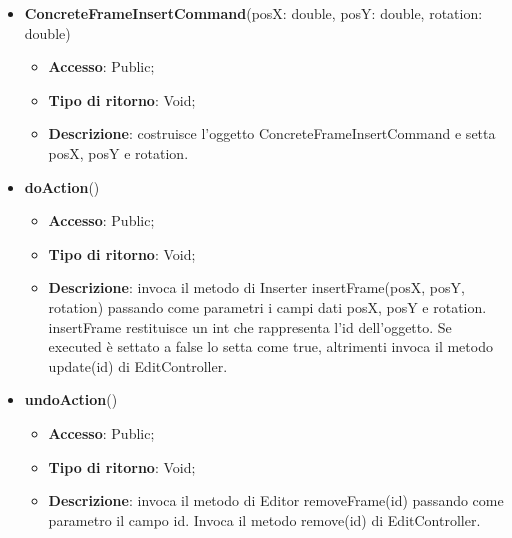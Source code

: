 {{{	
	\begin{itemize}
		\item \textbf{ConcreteFrameInsertCommand}(posX: double, posY: double, rotation: double)
		\begin{itemize}
			\item \textbf{Accesso}: Public;
			\item \textbf{Tipo di ritorno}: Void;
			\item \textbf{Descrizione}: costruisce l’oggetto ConcreteFrameInsertCommand e setta posX, posY e rotation.
		\end{itemize}
		\item \textbf{doAction}()
		\begin{itemize}
			\item \textbf{Accesso}: Public;
			\item \textbf{Tipo di ritorno}: Void;
			\item \textbf{Descrizione}: invoca il metodo di Inserter insertFrame(posX, posY, rotation) passando come parametri i  campi dati posX, posY e rotation. insertFrame restituisce un int che rappresenta l’id dell’oggetto. Se executed è settato a false lo setta come true, altrimenti invoca il metodo update(id) di EditController.
		\end{itemize}
		\item \textbf{undoAction}()
		\begin{itemize}
			\item \textbf{Accesso}: Public;
			\item \textbf{Tipo di ritorno}: Void;
			\item \textbf{Descrizione}: invoca il metodo di Editor removeFrame(id) passando come parametro il campo id. Invoca il metodo remove(id) di EditController.
		\end{itemize}
	\end{itemize}
	}
}}

